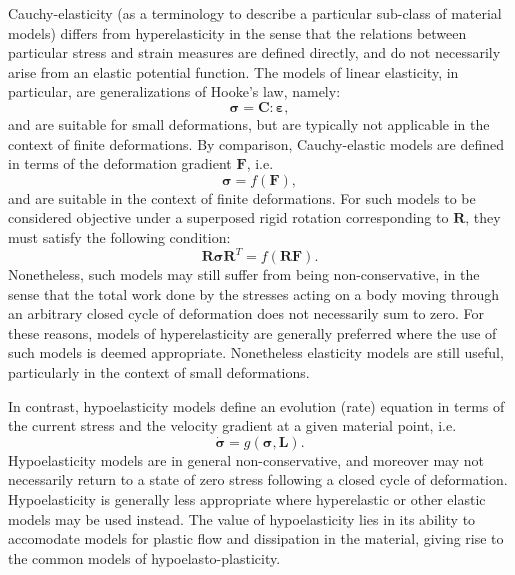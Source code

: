 Cauchy-elasticity (as a terminology to describe a particular sub-class of material models) differs from hyperelasticity in the sense that the relations between particular stress and strain measures are defined directly, and do not necessarily arise from an elastic potential function. The models of linear elasticity, in particular, are generalizations of Hooke's law, namely:
\begin{equation}
  \boldsymbol{\sigma} = \mathbf{C} \colon \boldsymbol{\varepsilon},
\end{equation}
and are suitable for small deformations, but are typically not applicable in the context of finite deformations. By comparison, Cauchy-elastic models are defined in terms of the deformation gradient $\mathbf{F}$, i.e.
\begin{equation}
  \boldsymbol{\sigma} = f (\mathbf{F}),
\end{equation}
and are suitable in the context of finite deformations. For such models to be considered objective under a superposed rigid rotation corresponding to $\mathbf{R}$, they must satisfy the following condition:
\begin{equation}
  \mathbf{R} \boldsymbol{\sigma} \mathbf{R}^T = f (\mathbf{R} \mathbf{F}).
\end{equation}
Nonetheless, such models may still suffer from being non-conservative, in the sense that the total work done by the stresses acting on a body moving through an arbitrary closed cycle of deformation does not necessarily sum to zero. For these reasons, models of hyperelasticity are generally preferred where the use of such models is deemed appropriate. Nonetheless elasticity models are still useful, particularly in the context of small deformations.

In contrast, hypoelasticity models define an evolution (rate) equation in terms of the current stress and the velocity gradient at a given material point, i.e.
\begin{equation}
  \dot{\boldsymbol{\sigma}} = g(\boldsymbol{\sigma}, \mathbf{L}).
\end{equation}
Hypoelasticity models are in general non-conservative, and moreover may not necessarily return to a state of zero stress following a closed cycle of deformation. Hypoelasticity is generally less appropriate where hyperelastic or other elastic models may be used instead. The value of hypoelasticity lies in its ability to accomodate models for plastic flow and dissipation in the material, giving rise to the common models of hypoelasto-plasticity.

